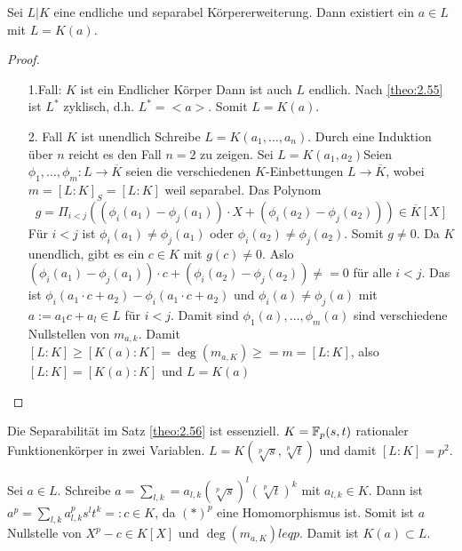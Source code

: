 \documentclass[../main.tex]{subfiles}
\begin{document}
\begin{theorem} \label{theo:2.56}
    Sei $L|K$ eine endliche und separabel Körpererweiterung.
    Dann existiert ein $a\in L$ mit $L=K(a)$.
\end{theorem}
\begin{proof} $ $
    \begin{enumerate}[align=left]
        \item [1.Fall: $K$ ist ein Endlicher Körper] 
        Dann ist auch $L$ endlich. Nach \cref{theo:2.55} ist $L^*$ zyklisch, d.h. $L^*=<a>$. 
        Somit $L=K(a)$.
        \item [2. Fall $K$ ist unendlich]
        Schreibe $L=K(a_1, \dots, a_n)$. Durch eine Induktion über $n$ reicht es den Fall $n=2$ zu zeigen.
        Sei $L = K(a_1,a_2)$Seien $\phi_1,\dots,\phi_m: L\rightarrow \overline{K}$ seien die verschiedenen $K$-Einbettungen $L\rightarrow \overline{K}$, wobei $m=[L:K]_S=[L:K]$ weil separabel.
        Das Polynom $$g = \Pi_{i<j} \left((\phi_i(a_1)-\phi_j(a_1))\cdot X + (\phi_i(a_2)-\phi_j(a_2))\right)\in \overline{K}[X]$$
        Für $i<j$ ist $\phi_i(a_1)\neq \phi_j(a_1)$ oder $\phi_i(a_2)\neq\phi_j(a_2)$.
        Somit $g\neq 0$.
        Da $K$ unendlich, gibt es ein $c\in K$ mit $g(c)\neq 0$.
        Aslo $(\phi_i(a_1)-\phi_j(a_1))\cdot c + (\phi_i(a_2)-\phi_j(a_2)) \neq = 0$ für alle $i<j$.
        Das ist $\phi_i(a_1 \cdot c + a_2)- \phi_i(a_1\cdot c + a_2)$ und $\phi_i(a) \neq \phi_j(a)$ mit $a := a_1c+a_l\in L$ für $i<j$.
        Damit sind $\phi_1(a),\dots,\phi_m(a)$ sind verschiedene Nullstellen von $m_{a,k}$.
        Damit $[L:K] \geq [K(a):K] = \deg(m_{a,K}) \geq = m = [L:K]$, also $[L:K] = [K(a):K]$ und $L=K(a)$
    \end{enumerate}
\end{proof}
\begin{example}
    Die Separabilität im Satz \cref{theo:2.56} ist essenziell.
    $K=\mathbb{F}_p(s,t)$ rationaler Funktionenkörper in zwei Variablen.
    $L=K(\sqrt[p]{s},\sqrt[p]{t})$ und damit $[L:K] = p^2$. \TODO[Graphik]

    Sei $a\in L$.
    Schreibe $a = \sum_{l,k} = a_{l,k} (\sqrt[p]{s})^l(\sqrt[p]{t})^k$ mit $a_{l,k}\in K$.
    Dann ist $a^p=\sum_{l,k} a_{l,k}^p s^l t^k =: c\in K$, da $(*)^p$ eine Homomorphismus ist.
    Somit ist $a$ Nullstelle von $X^p-c\in K[X]$ und $\deg(m_{a,K}) leq p$.
    Damit ist $K(a)\subset L$.
\end{example}
\end{document}
